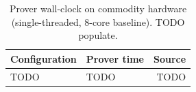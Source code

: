 \begin{table}[t]
  \centering
  \caption{Prover wall-clock on commodity hardware (single-threaded,
    8-core baseline). TODO populate.}
  \label{tab:prover-time}
  \begin{tabularx}{\columnwidth}{lXr}
    \toprule
    Configuration & Prover time & Source \\
    \midrule
    TODO & TODO & TODO \\
    \bottomrule
  \end{tabularx}
\end{table}
